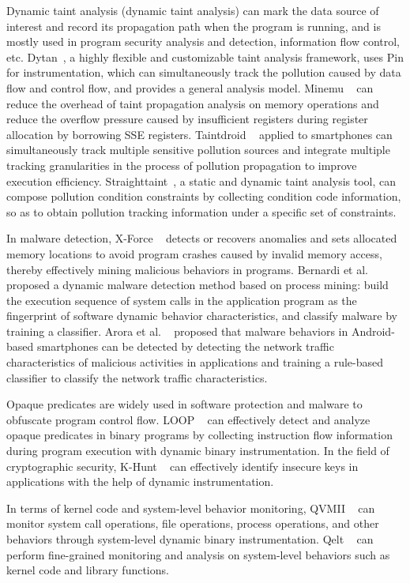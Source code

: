 Dynamic taint analysis (dynamic taint analysis) can mark the data source of interest and record its propagation path when the program is running, and is mostly used in program security analysis and detection, information flow control, etc.
Dytan~\cite{DBLP:conf/issta/ClauseLO07}, a highly flexible and customizable taint analysis framework, uses Pin for instrumentation, which can simultaneously track the pollution caused by data flow and control flow, and provides a general analysis model.
Minemu ~\cite{DBLP:conf/raid/BosmanSB11} can reduce the overhead of taint propagation analysis on memory operations and reduce the overflow pressure caused by insufficient registers during register allocation by borrowing SSE registers.
Taintdroid ~\cite{DBLP:journals/tocs/EnckGHTCCJMS14} applied to smartphones can simultaneously track multiple sensitive pollution sources and integrate multiple tracking granularities in the process of pollution propagation to improve execution efficiency.
Straighttaint~\cite{DBLP:conf/kbse/MingWWXL16}, a static and dynamic taint analysis tool, can compose pollution condition constraints by collecting condition code information, so as to obtain pollution tracking information under a specific set of constraints.

In malware detection, X-Force ~\cite{DBLP:conf/uss/PengDZXLS14} detects or recovers anomalies and sets allocated memory locations to avoid program crashes caused by invalid memory access, thereby effectively mining malicious behaviors in programs.
Bernardi et al. ~\cite{DBLP:journals/ijisec/BernardiCDMM19} proposed a dynamic malware detection method based on process mining: build the execution sequence of system calls in the application program as the fingerprint of software dynamic behavior characteristics, and classify malware by training a classifier.
Arora et al. ~\cite{DBLP:conf/ngmast/AroraGP14} proposed that malware behaviors in Android-based smartphones can be detected by detecting the network traffic characteristics of malicious activities in applications and training a rule-based classifier to classify the network traffic characteristics.

Opaque predicates are widely used in software protection and malware to obfuscate program control flow.
LOOP ~\cite{DBLP:conf/ccs/MingXWW15} can effectively detect and analyze opaque predicates in binary programs by collecting instruction flow information during program execution with dynamic binary instrumentation.
In the field of cryptographic security, K-Hunt ~\cite{DBLP:conf/ccs/LiLCZG18} can effectively identify insecure keys in applications with the help of dynamic instrumentation.

In terms of kernel code and system-level behavior monitoring, QVMII ~\cite{DBLP:conf/sigsoft/DovgalyukFVM17} can monitor system call operations, file operations, process operations, and other behaviors through system-level dynamic binary instrumentation.
Qelt ~\cite{DBLP:conf/vee/CotaC19} can perform fine-grained monitoring and analysis on system-level behaviors such as kernel code and library functions.
